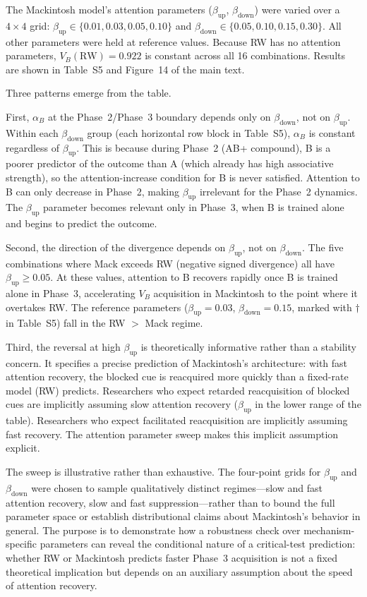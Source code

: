 \documentclass[11pt,a4paper]{article}
\begin{document}
The Mackintosh model's attention parameters ($\beta_{\text{up}}$, $\beta_{\text{down}}$) were varied over a $4 \times 4$ grid: $\beta_{\text{up}} \in \{0.01, 0.03, 0.05, 0.10\}$ and $\beta_{\text{down}} \in \{0.05, 0.10, 0.15, 0.30\}$. All other parameters were held at reference values. Because RW has no attention parameters, $V_B(\text{RW}) = 0.922$ is constant across all 16 combinations. Results are shown in Table~S5 and Figure~14 of the main text.

Three patterns emerge from the table.

First, $\alpha_B$ at the Phase~2/Phase~3 boundary depends only on $\beta_{\text{down}}$, not on $\beta_{\text{up}}$. Within each $\beta_{\text{down}}$ group (each horizontal row block in Table~S5), $\alpha_B$ is constant regardless of $\beta_{\text{up}}$. This is because during Phase~2 (AB+ compound), B is a poorer predictor of the outcome than A (which already has high associative strength), so the attention-increase condition for B is never satisfied. Attention to B can only decrease in Phase~2, making $\beta_{\text{up}}$ irrelevant for the Phase~2 dynamics. The $\beta_{\text{up}}$ parameter becomes relevant only in Phase~3, when B is trained alone and begins to predict the outcome.

Second, the direction of the divergence depends on $\beta_{\text{up}}$, not on $\beta_{\text{down}}$. The five combinations where Mack exceeds RW (negative signed divergence) all have $\beta_{\text{up}} \geq 0.05$. At these values, attention to B recovers rapidly once B is trained alone in Phase~3, accelerating $V_B$ acquisition in Mackintosh to the point where it overtakes RW. The reference parameters ($\beta_{\text{up}} = 0.03$, $\beta_{\text{down}} = 0.15$, marked with $\dagger$ in Table~S5) fall in the RW $>$ Mack regime.

Third, the reversal at high $\beta_{\text{up}}$ is theoretically informative rather than a stability concern. It specifies a precise prediction of Mackintosh's architecture: with fast attention recovery, the blocked cue is reacquired more quickly than a fixed-rate model (RW) predicts. Researchers who expect retarded reacquisition of blocked cues are implicitly assuming slow attention recovery ($\beta_{\text{up}}$ in the lower range of the table). Researchers who expect facilitated reacquisition are implicitly assuming fast recovery. The attention parameter sweep makes this implicit assumption explicit.

The sweep is illustrative rather than exhaustive. The four-point grids for $\beta_{\text{up}}$ and $\beta_{\text{down}}$ were chosen to sample qualitatively distinct regimes---slow and fast attention recovery, slow and fast suppression---rather than to bound the full parameter space or establish distributional claims about Mackintosh's behavior in general. The purpose is to demonstrate how a robustness check over mechanism-specific parameters can reveal the conditional nature of a critical-test prediction: whether RW or Mackintosh predicts faster Phase~3 acquisition is not a fixed theoretical implication but depends on an auxiliary assumption about the speed of attention recovery.
\end{document}
